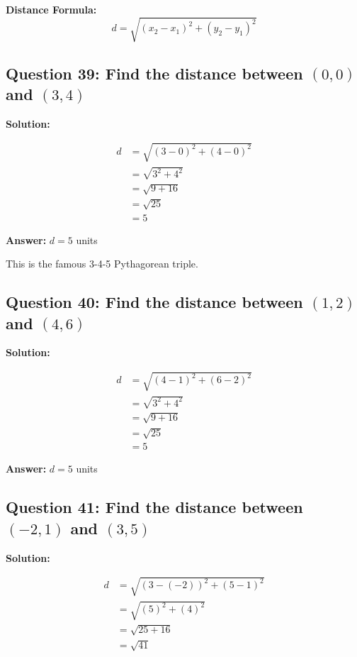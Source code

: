 \documentclass[12pt]{article}
\begin{document}
\textbf{Distance Formula:}
$$d = \sqrt{(x_2 - x_1)^2 + (y_2 - y_1)^2}$$

\subsection*{Question 39: Find the distance between $(0, 0)$ and $(3, 4)$}

\noindent\textbf{Solution:}

\begin{align*}
d &= \sqrt{(3 - 0)^2 + (4 - 0)^2} \\
&= \sqrt{3^2 + 4^2} \\
&= \sqrt{9 + 16} \\
&= \sqrt{25} \\
&= 5
\end{align*}

\textbf{Answer: } $d = 5$ units

This is the famous 3-4-5 Pythagorean triple.

\vspace{0.3cm}

\subsection*{Question 40: Find the distance between $(1, 2)$ and $(4, 6)$}

\noindent\textbf{Solution:}

\begin{align*}
d &= \sqrt{(4 - 1)^2 + (6 - 2)^2} \\
&= \sqrt{3^2 + 4^2} \\
&= \sqrt{9 + 16} \\
&= \sqrt{25} \\
&= 5
\end{align*}

\textbf{Answer: } $d = 5$ units

\vspace{0.3cm}

\subsection*{Question 41: Find the distance between $(-2, 1)$ and $(3, 5)$}

\noindent\textbf{Solution:}

\begin{align*}
d &= \sqrt{(3 - (-2))^2 + (5 - 1)^2} \\
&= \sqrt{(5)^2 + (4)^2} \\
&= \sqrt{25 + 16} \\
&= \sqrt{41}
\end{align*}
\end{document}
